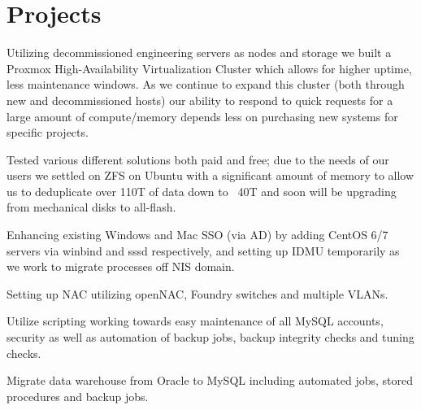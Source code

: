 \documentclass[letterpaper]{deedy-resume} %
\begin{document}
%
\begin{minipage}[t]{0.66\textwidth} %

\section{Projects}

Utilizing decommissioned engineering servers as nodes and storage we built a Proxmox High-Availability Virtualization Cluster which allows for higher uptime, less maintenance windows.  As we continue to expand this cluster (both through new and decommissioned hosts) our ability to respond to quick requests for a large amount of compute/memory depends less on purchasing new systems for specific projects.
\sectionspace %

Tested various different solutions both paid and free; due to the needs of our users we settled on ZFS on Ubuntu with a significant amount of memory to allow us to deduplicate over 110T of data down to ~40T and soon will be upgrading from mechanical disks to all-flash.
\sectionspace %

Enhancing existing Windows and Mac SSO (via AD) by adding CentOS 6/7 servers via winbind and sssd respectively, and setting up IDMU temporarily as we work to migrate processes off NIS domain.
\sectionspace %

Setting up NAC utilizing openNAC, Foundry switches and multiple VLANs.
\sectionspace %

Utilize scripting working towards easy maintenance of all MySQL accounts, security as well as automation of backup jobs, backup integrity checks and tuning checks.
\sectionspace %

Migrate data warehouse from Oracle to MySQL including automated jobs, stored procedures and backup jobs.
\sectionspace %



\end{minipage} %
\end{document}

